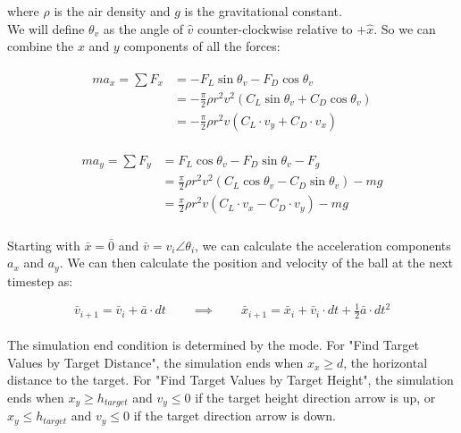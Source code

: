 \documentclass[a4paper]{article}
\begin{document}
	where $ \rho $ is the air density and $ g $ is the gravitational constant.\\
	
	We will define $ \theta_v $ as the angle of $ \hat{v} $ counter-clockwise relative to $ + \hat{x} $. So we can combine the $ x $ and $ y $ components of all the forces:
	
	\begin{gather}
	\begin{aligned}
		m a_x = \sum F_x &= -F_L \sin \theta_v - F_D \cos \theta_v \\
		&= - \frac{\pi}{2} \rho r^2 v^2 \left( C_L \sin \theta_v + C_D \cos \theta_v \right) \\
		&= - \frac{\pi}{2} \rho r^2 v \left( C_L \cdot v_y + C_D \cdot v_x \right)
	\end{aligned}
	\end{gather}
	
	\begin{gather}
		\begin{aligned}
			m a_y = \sum F_y &= F_L \cos \theta_v - F_D \sin \theta_v - F_g \\
			&= \frac{\pi}{2} \rho r^2 v^2 \left( C_L \cos \theta_v - C_D \sin \theta_v \right) - mg \\
			&= \frac{\pi}{2} \rho r^2 v \left( C_L \cdot v_x - C_D \cdot v_y \right) - mg
		\end{aligned}
	\end{gather}\\
	
	Starting with $ \bar{x} = \bar{0} $ and $ \bar{v} = v_i \angle \theta_i $, we can calculate the acceleration components $ a_x $ and $ a_y $. We can then calculate the position and velocity of the ball at the next timestep as:
	
	\begin{equation}
		\bar{v}_{i+1} = \bar{v}_i + \bar{a} \cdot dt \qquad\implies\qquad
		\bar{x}_{i+1} = \bar{x}_{i} + \bar{v}_i \cdot dt + \tfrac{1}{2} \bar{a} \cdot dt^2		
	\end{equation}\\
	
	The simulation end condition is determined by the mode. For "Find Target Values by Target Distance", the simulation ends when $ x_x \geq d $, the horizontal distance to the target. For "Find Target Values by Target Height", the simulation ends when $ x_y \geq h_{target} $ and $ v_y \leq 0 $ if the target height direction arrow is up, or $ x_y \leq h_{target} $ and $ v_y \leq 0 $ if the target direction arrow is down.\\
	
\end{document}
